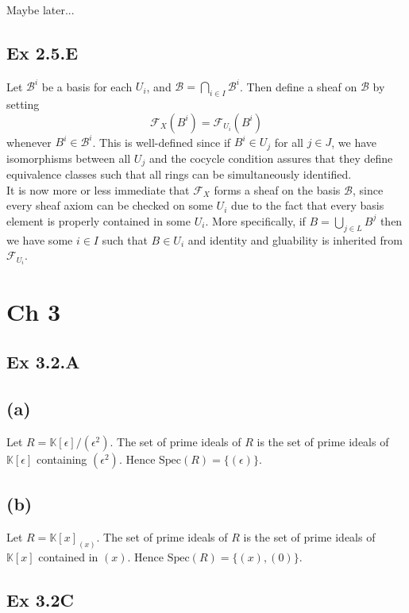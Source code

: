 \documentclass{article}
\theoremstyle{definition}
\newcommand{\K}{\mathbb{K}}
\newcommand{\Spec}{\text{Spec}}
\begin{document}
Maybe later...

\subsection*{Ex 2.5.E}

Let $\mathcal{B}^i$ be a basis for each $U_i$, and $\mathcal{B} = \bigcap_{i
\in I} \mathcal{B}^i$. Then define a sheaf on $\mathcal{B}$ by setting 
\[
	\mathcal{F}_X(B^i) = \mathcal{F}_{U_i}(B^i)
\] 
whenever $B^i \in \mathcal{B}^i$. This is well-defined since if $B^i \in U_j$
for all $j \in J$, we have isomorphisms between all $U_j$ and the cocycle
condition assures that they define equivalence classes such that all rings can
be simultaneously identified. \\

It is now more or less immediate that $\mathcal{F}_X$ forms a sheaf on the
basis $\mathcal{B}$, since every sheaf axiom can be checked on some $U_i$ due
to the fact that every basis element is properly contained in some $U_i$. More
specifically, if $B = \bigcup_{j \in L} B^j$ then we have some $i \in I$ such
that $B \in U_i$ and identity and gluability is inherited from
$\mathcal{F}_{U_i}$.

\section*{Ch 3}

\subsection*{Ex 3.2.A}

\subsection*{(a)}

Let $R = \K[\epsilon]/(\epsilon^2)$. The set of prime ideals of $R$ is the set
of prime ideals of $\K[\epsilon]$ containing $(\epsilon^2)$. Hence $\Spec(R) =
\{(\epsilon)\}$.

\subsection*{(b)}

Let $R = \K[x]_{(x)}$. The set of prime ideals of $R$ is the set of prime
ideals of $\K[x]$ contained in $(x)$. Hence $\Spec(R) = \{(x), (0)\}$.


\subsection*{Ex 3.2C}
\end{document}
